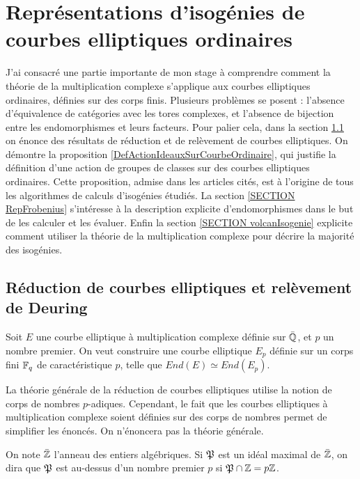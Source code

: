 \section{Représentations d'isogénies de courbes elliptiques ordinaires}\label{SECTION courbeElliptiqueOrdinaire}

J'ai consacré une partie importante de mon stage à comprendre comment la théorie de la multiplication complexe s'applique aux courbes elliptiques ordinaires, définies sur des corps finis. Plusieurs problèmes se posent : l'absence d'équivalence de catégories avec les tores complexes, et l'absence de bijection entre les endomorphismes et leurs facteurs. Pour palier cela, dans la section \ref{SECTION ReducRelev} on énonce des résultats de réduction et de relèvement de courbes elliptiques. On démontre la proposition \ref{DefActionIdeauxSurCourbeOrdinaire}, qui justifie la définition d'une action de groupes de classes sur des courbes elliptiques ordinaires. Cette proposition, admise dans les articles cités, est à l'origine de tous les algorithmes de calculs d'isogénies étudiés. La section \ref{SECTION RepFrobenius} s'intéresse à la description explicite d'endomorphismes dans le but de les calculer et les évaluer. Enfin la section \ref{SECTION volcanIsogenie} explicite comment utiliser la théorie de la multiplication complexe pour décrire la majorité des isogénies. 


\subsection{Réduction de courbes elliptiques et relèvement de Deuring}\label{SECTION ReducRelev}


Soit $E$ une courbe elliptique à multiplication complexe définie sur $\bar{\mathbb{Q}}$, et $p$ un nombre premier. On veut construire une courbe elliptique $E_p$ définie sur un corps fini $\mathbb{F}_{q}$ de caractéristique $p$, telle que $End(E)\simeq End(E_p)$.

\begin{Rem}
	La théorie générale de la réduction de courbes elliptiques utilise la notion de corps de nombres $p$-adiques. Cependant, le fait que les courbes elliptiques à multiplication complexe soient définies sur des corps de nombres permet de simplifier les énoncés. On n'énoncera pas la théorie générale.
\end{Rem}  

\begin{Def}
	On note $\bar{\mathbb{Z}}$ l'anneau des entiers algébriques. Si $\mathfrak{P}$ est un idéal maximal de $\bar{\mathbb{Z}}$, on dira que $\mathfrak{P}$ est au-dessus d'un nombre premier $p$ si $\mathfrak{P}\cap\mathbb{Z} = p\mathbb{Z}$. 
\end{Def}


